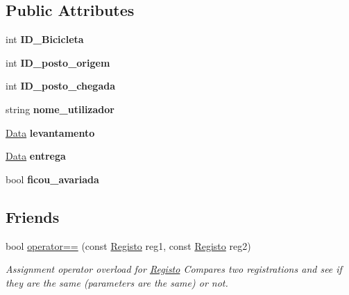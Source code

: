 \subsection*{Public Attributes}
\begin{DoxyCompactItemize}
\item 
\hypertarget{class_registo_af745f6be9e0f119ff8285f2ad7bc0007}{int {\bfseries I\+D\+\_\+\+Bicicleta}}\label{class_registo_af745f6be9e0f119ff8285f2ad7bc0007}

\item 
\hypertarget{class_registo_ab1eceed0788883d77f331da0eed92876}{int {\bfseries I\+D\+\_\+posto\+\_\+origem}}\label{class_registo_ab1eceed0788883d77f331da0eed92876}

\item 
\hypertarget{class_registo_a95a2f4c5bbad742f0ccdfc0da873a2c2}{int {\bfseries I\+D\+\_\+posto\+\_\+chegada}}\label{class_registo_a95a2f4c5bbad742f0ccdfc0da873a2c2}

\item 
\hypertarget{class_registo_a58143db2825d4cc53f502001fa5d7659}{string {\bfseries nome\+\_\+utilizador}}\label{class_registo_a58143db2825d4cc53f502001fa5d7659}

\item 
\hypertarget{class_registo_ac0d3e2faff6e42050b6f75a3db8ae92b}{\hyperlink{class_data}{Data} {\bfseries levantamento}}\label{class_registo_ac0d3e2faff6e42050b6f75a3db8ae92b}

\item 
\hypertarget{class_registo_a051ce058418ededccbe9aae6900cd817}{\hyperlink{class_data}{Data} {\bfseries entrega}}\label{class_registo_a051ce058418ededccbe9aae6900cd817}

\item 
\hypertarget{class_registo_afa35faa61b95b63bbab972cfaca38b98}{bool {\bfseries ficou\+\_\+avariada}}\label{class_registo_afa35faa61b95b63bbab972cfaca38b98}

\end{DoxyCompactItemize}
\subsection*{Friends}
\begin{DoxyCompactItemize}
\item 
bool \hyperlink{class_registo_aaf8e089b26abe6bc63d1c2399433bce6}{operator==} (const \hyperlink{class_registo}{Registo} reg1, const \hyperlink{class_registo}{Registo} reg2)
\begin{DoxyCompactList}\small\item\em Assignment operator overload for \hyperlink{class_registo}{Registo} Compares two registrations and see if they are the same (parameters are the same) or not. \end{DoxyCompactList}\end{DoxyCompactItemize}


